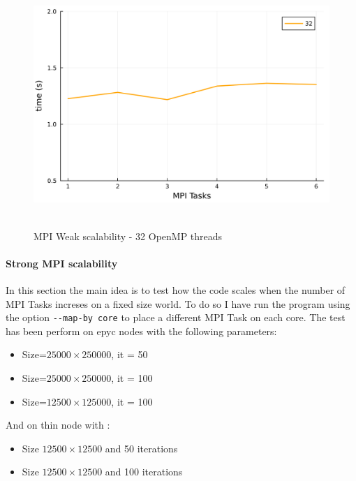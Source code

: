 \documentclass[
  letterpaper,
  DIV=11,
  numbers=noendperiod]{scrartcl}
\let\oldparagraph\paragraph
\renewcommand{\paragraph}[1]{\oldparagraph{#1}\mbox{}}
\providecommand{\tightlist}{%
  \setlength{\itemsep}{0pt}\setlength{\parskip}{0pt}}\usepackage{longtable,booktabs,array}
\begin{document}
\begin{figure}

{\centering \includegraphics[width=\textwidth,height=3.64583in]{img/weak_scalability_mpi_32.png}

}

\caption{MPI Weak scalability - 32 OpenMP threads}

\end{figure}

\newpage

\hypertarget{strong-mpi-scalability}{%
\paragraph{Strong MPI scalability}\label{strong-mpi-scalability}}

In this section the main idea is to test how the code scales when the
number of MPI Tasks increses on a fixed size world. To do so I have run
the program using the option \texttt{-\/-map-by\ core} to place a
different MPI Task on each core. The test has been perform on epyc nodes
with the following parameters:

\begin{itemize}
\tightlist
\item
  Size=\(25000\times 250000\), it = 50
\item
  Size=\(25000\times 250000\), it = 100
\item
  Size=\(12500\times 125000\), it = 100
\end{itemize}

And on thin node with :

\begin{itemize}
\tightlist
\item
  Size \(12500\times 12500\) and 50 iterations
\item
  Size \(12500\times 12500\) and 100 iterations
\end{itemize}
\end{document}

